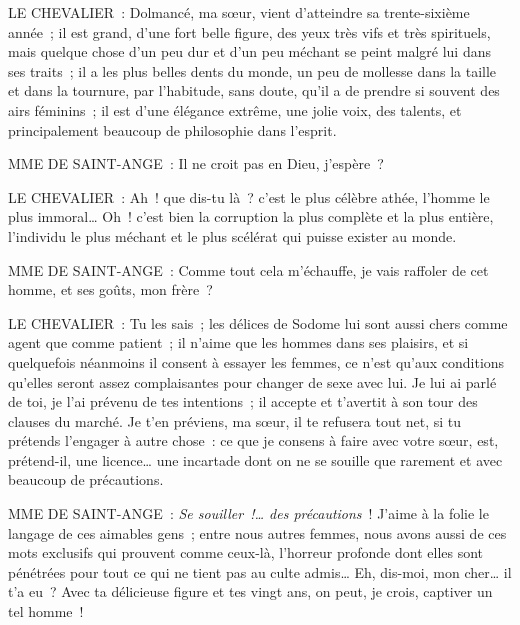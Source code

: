\documentclass[french,twoside]{book} %
\begin{document}
LE CHEVALIER : Dolmancé, ma sœur, vient d’atteindre sa trente-sixième année ; il est grand, d’une fort belle figure, des yeux très vifs et très spirituels, mais quelque chose d’un peu dur et d’un peu méchant se peint malgré lui dans ses traits ; il a les plus belles dents du monde, un peu de mollesse dans la taille et dans la tournure, par l’habitude, sans doute, qu’il a de prendre si souvent des airs féminins ; il est d’une élégance extrême, une jolie voix, des talents, et principalement beaucoup de philosophie dans l’esprit.\par
MME DE SAINT-ANGE : Il ne croit pas en Dieu, j’espère ?\par
LE CHEVALIER : Ah ! que dis-tu là ? c’est le plus célèbre athée, l’homme le plus immoral… Oh ! c’est bien la corruption la plus complète et la plus entière, l’individu le plus méchant et le plus scélérat qui puisse exister au monde.\par
MME DE SAINT-ANGE : Comme tout cela m’échauffe, je vais raffoler de cet homme, et ses goûts, mon frère ?\par
LE CHEVALIER : Tu les sais ; les délices de Sodome lui sont aussi chers comme agent que comme patient ; il n’aime que les hommes dans ses plaisirs, et si quelquefois néanmoins il consent à essayer les femmes, ce n’est qu’aux conditions qu’elles seront assez complaisantes pour changer de sexe avec lui. Je lui ai parlé de toi, je l’ai prévenu de tes intentions ; il accepte et t’avertit à son tour des clauses du marché. Je t’en préviens, ma sœur, il te refusera tout net, si tu prétends l’engager à autre chose : ce que je consens à faire avec votre sœur, est, prétend-il, une licence… une incartade dont on ne se souille que rarement et avec beaucoup de précautions.\par
MME DE SAINT-ANGE : {\itshape Se souiller !… des précautions} ! J’aime à la folie le langage de ces aimables gens ; entre nous autres femmes, nous avons aussi de ces mots exclusifs qui prouvent comme ceux-là, l’horreur profonde dont elles sont pénétrées pour tout ce qui ne tient pas au culte admis… Eh, dis-moi, mon cher… il t’a eu ? Avec ta délicieuse figure et tes vingt ans, on peut, je crois, captiver un tel homme !\par
\end{document}
